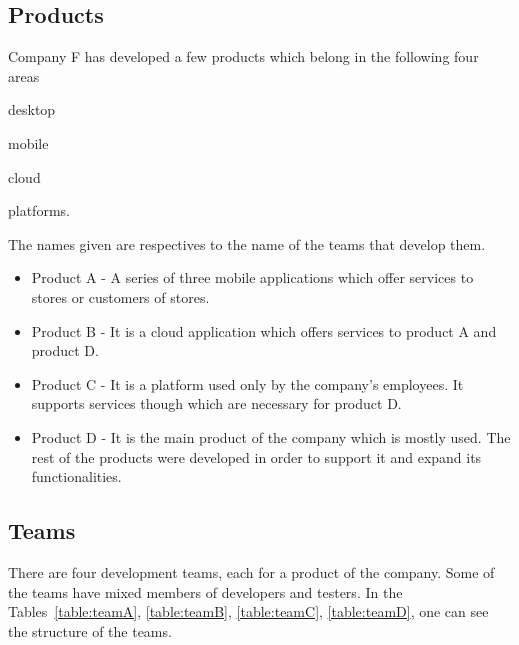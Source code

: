 \subsection{Products}
Company F has developed a few products which belong in the following four areas 
\begin{inparaenum} [a\upshape)]
\item desktop
\item mobile
\item cloud
\item platforms.
\end{inparaenum}
The names given are respectives to the name of the teams that develop them.

\begin{itemize}
\item Product A - A series of three mobile applications which offer services to stores or customers of stores.
\item Product B - It is a cloud application which offers services to product A and product D.
\item Product C - It is a platform used only by the company's employees. It supports services though which are necessary for product D.
\item Product D - It is the main product of the company which is mostly used. The rest of the products were developed in order to support it and expand its functionalities.

\end{itemize}

\subsection{Teams}
There are four development teams, each for a product of the company. Some of the teams have mixed members of developers and testers. In the Tables~\ref{table:teamA}, \ref{table:teamB}, \ref{table:teamC}, \ref{table:teamD}, one can see the structure of the teams. \\

